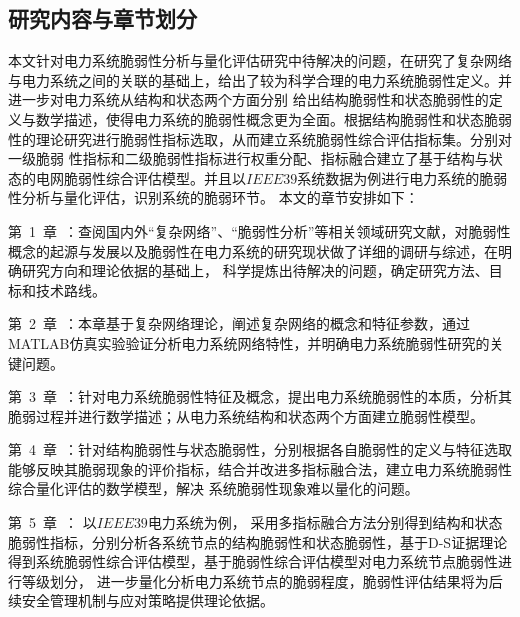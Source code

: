 \subsection{研究内容与章节划分}
\label{sec:contendAndIdea}
本文针对电力系统脆弱性分析与量化评估研究中待解决的问题，在研究了复杂网络与电力系统之间的关联的基础上，给出了较为科学合理的电力系统脆弱性定义。并进一步对电力系统从结构和状态两个方面分别
给出结构脆弱性和状态脆弱性的定义与数学描述，使得电力系统的脆弱性概念更为全面。根据结构脆弱性和状态脆弱性的理论研究进行脆弱性指标选取，从而建立系统脆弱性综合评估指标集。分别对一级脆弱
性指标和二级脆弱性指标进行权重分配、指标融合建立了基于结构与状态的电网脆弱性综合评估模型。并且以$IEEE39$系统数据为例进行电力系统的脆弱性分析与量化评估，识别系统的脆弱环节。
本文的章节安排如下：

第~1~章~：查阅国内外“复杂网络”、“脆弱性分析”等相关领域研究文献，对脆弱性概念的起源与发展以及脆弱性在电力系统的研究现状做了详细的调研与综述，在明确研究方向和理论依据的基础上，
科学提炼出待解决的问题，确定研究方法、目标和技术路线。

第~2~章~：本章基于复杂网络理论，阐述复杂网络的概念和特征参数，通过MATLAB仿真实验验证分析电力系统网络特性，并明确电力系统脆弱性研究的关键问题。

第~3~章~：针对电力系统脆弱性特征及概念，提出电力系统脆弱性的本质，分析其脆弱过程并进行数学描述；从电力系统结构和状态两个方面建立脆弱性模型。

第~4~章~：针对结构脆弱性与状态脆弱性，分别根据各自脆弱性的定义与特征选取能够反映其脆弱现象的评价指标，结合并改进多指标融合法，建立电力系统脆弱性综合量化评估的数学模型，解决
系统脆弱性现象难以量化的问题。


第~5~章~：%
以$IEEE39$电力系统为例，
采用多指标融合方法分别得到结构和状态脆弱性指标，分别分析各系统节点的结构脆弱性和状态脆弱性，基于D-S证据理论得到系统脆弱性综合评估模型，基于脆弱性综合评估模型对电力系统节点脆弱性进行等级划分，
进一步量化分析电力系统节点的脆弱程度，脆弱性评估结果将为后续安全管理机制与应对策略提供理论依据。

